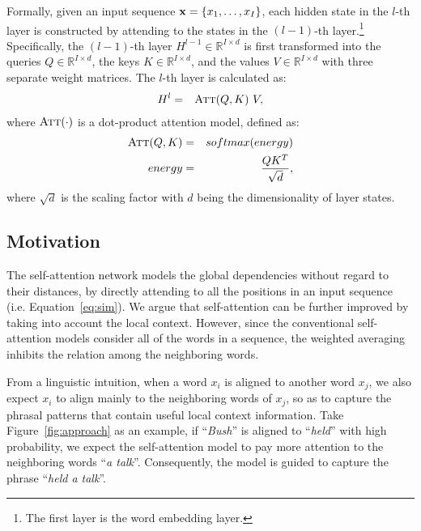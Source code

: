 \documentclass[11pt,a4paper]{article}
\begin{document}
Formally, given an input sequence ${\bf x}=\{x_1, \dots, x_I\}$, each hidden state in the $l$-th layer is constructed by attending to the states in the $(l-1)$-th layer.\footnote{The first layer is the word embedding layer.}
Specifically, the $(l-1)$-th layer ${H}^{l-1} \in \mathbb{R}^{I\times d}$ is first transformed into the queries $Q \in \mathbb{R}^{I\times d}$, the keys $K \in \mathbb{R}^{I\times d}$, and the values $V \in \mathbb{R}^{I\times d}$ with three separate weight matrices. The $l$-th layer is calculated as:
\begin{eqnarray}
    H^l &=& \textsc{Att}(Q, K)\ V \label{eq:out},
\end{eqnarray}
where $\textsc{Att}(\cdot)$ is a dot-product attention model, defined as:
\begin{eqnarray}
    \textsc{Att}(Q, K) &=& softmax(energy) \label{eq:softmax} \\
    energy &=& \frac{QK^T}{\sqrt{d}}, \label{eq:sim}
\end{eqnarray}
where $\sqrt{d}$ is the scaling factor with $d$ being the dimensionality of layer states.



\subsection{Motivation}
\iffalse
\begin{figure}[t]
\begin{center}
\texttt{[image: figures/self-attention.pdf]}
\caption{
\label{fig:self-attention}
Illustration of self-attention networks.
}
\end{center}
\end{figure}
\fi
The self-attention network models the global dependencies without regard to their distances, by directly attending to all the positions in an input sequence (i.e. Equation~\ref{eq:sim}).
We argue that self-attention can be further improved by taking into account the local context.
However, since the conventional self-attention models consider all of the words in a sequence, the weighted averaging inhibits the relation among the neighboring words.

From a linguistic intuition, when a word $x_i$ is aligned to another word $x_j$, we also expect $x_i$ to align mainly to the neighboring words of $x_j$, so as to capture the phrasal patterns that contain useful local context information.
Take Figure~\ref{fig:approach} as an example, if ``{\em Bush}'' is aligned to ``{\em held}'' with high probability, we expect the self-attention model to pay more attention to the neighboring words ``{\em a talk}''. 
Consequently, the model is guided to capture the phrase ``{\em held a talk}''.
\end{document}
